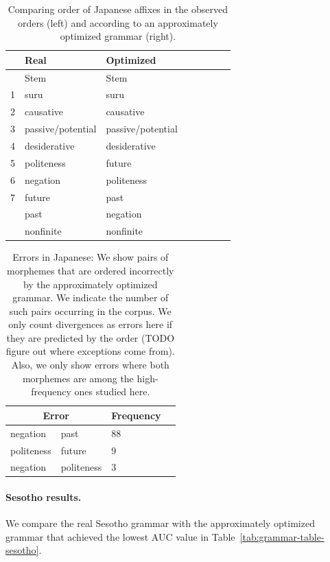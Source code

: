 \begin{table}
    \centering
    \begin{tabular}{llllllll}
	    &	    Real & Optimized \\ \hline\hline
	    &    Stem & Stem \\ \hline
1 & suru & suru \\
2 & causative & causative \\
3 & passive/potential & passive/potential \\
4 & desiderative & desiderative \\
5 & politeness & future \\
6 & negation & politeness \\
7 & future & past \\
 & past & negation \\
 & nonfinite & nonfinite \\ 
 \hline
    \end{tabular}
    \caption{Comparing order of Japanese affixes in the observed orders (left) and according to an approximately optimized grammar (right).}
    \label{tab:grammar-table-jap}
\end{table}

\begin{table}
    \centering
    \begin{tabular}{ll|ll}
    \multicolumn{2}{c|}{Error} & Frequency \\ \hline\hline
negation & past & 88 \\
politeness & future & 9 \\
negation & politeness & 3 \\
\end{tabular}
    \caption{Errors in Japanese: We show pairs of morphemes that are ordered incorrectly by the approximately optimized grammar.
    We indicate the number of such pairs occurring in the corpus.
    We only count divergences as errors here if they are predicted by the order (TODO figure out where exceptions come from). Also, we only show errors where both morphemes are among the high-frequency ones studied here.
    }
    \label{tab:jap-err-analysis}
\end{table}

\paragraph{Sesotho results.} We compare the real Sesotho grammar with the approximately optimized grammar that achieved the lowest AUC value in Table~\ref{tab:grammar-table-sesotho}.

